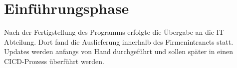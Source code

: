 \section{Einführungsphase}
\label{sec:Einfuehrungsphase}
Nach der Fertigstellung des Programms erfolgte die Übergabe an die IT-Abteilung.
Dort fand die Auslieferung innerhalb des Firmenintranets statt.
Updates werden anfangs von Hand durchgeführt und sollen später in einen
\ac{CICD}-Prozess überführt werden.
